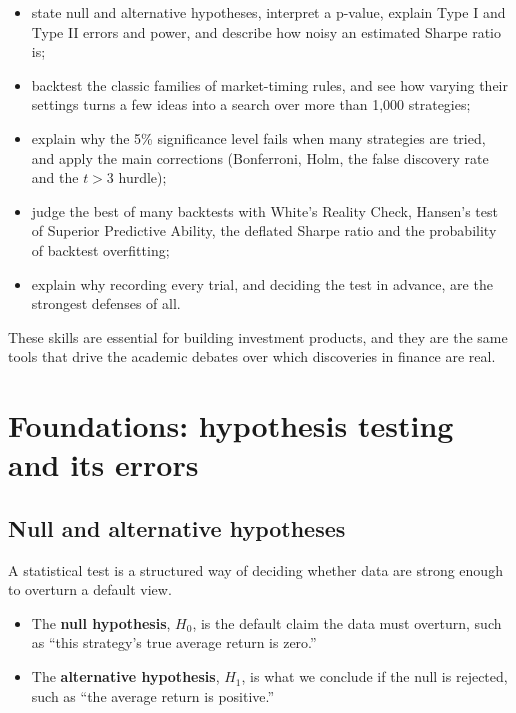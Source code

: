 \begin{itemize}
  \item state null and alternative hypotheses, interpret a p-value, explain Type I and Type II errors and power, and describe how noisy an estimated Sharpe ratio is;
  \item backtest the classic families of market-timing rules, and see how varying their settings turns a few ideas into a search over more than 1,000 strategies;
  \item explain why the 5\% significance level fails when many strategies are tried, and apply the main corrections (Bonferroni, Holm, the false discovery rate and the $t > 3$ hurdle);
  \item judge the best of many backtests with White's Reality Check, Hansen's test of Superior Predictive Ability, the deflated Sharpe ratio and the probability of backtest overfitting;
  \item explain why recording every trial, and deciding the test in advance, are the strongest defenses of all.
\end{itemize}

These skills are essential for building investment products, and they are
the same tools that drive the academic debates over which discoveries in finance are real.

\section{Foundations: hypothesis testing and its errors}
\label{sec:04-foundations}

\subsection{Null and alternative hypotheses}

A statistical test is a structured way of deciding whether data are strong enough to overturn a default view.

\begin{itemize}
  \item The \textbf{null hypothesis}, $H_0$, is the default claim the data must overturn, such as ``this strategy's true average return is zero.''
  \item The \textbf{alternative hypothesis}, $H_1$, is what we conclude if the null is rejected, such as ``the average return is positive.''
\end{itemize}

